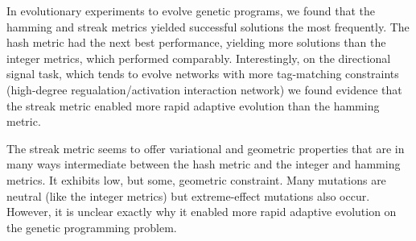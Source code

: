 In evolutionary experiments to evolve genetic programs, we found that the hamming and streak metrics yielded successful solutions the most frequently.
The hash metric had the next best performance, yielding more solutions than the integer metrics, which performed comparably.
Interestingly, on the directional signal task, which tends to evolve networks with more tag-matching constraints (high-degree regualation/activation interaction network) we found evidence that the streak metric enabled more rapid adaptive evolution than the hamming metric.

The streak metric seems to offer variational and geometric properties that are in many ways intermediate between the hash metric and the integer and hamming metrics.
It exhibits low, but some, geometric constraint.
Many mutations are neutral (like the integer metrics) but extreme-effect mutations also occur.
However, it is unclear exactly why it enabled more rapid adaptive evolution on the genetic programming problem.



